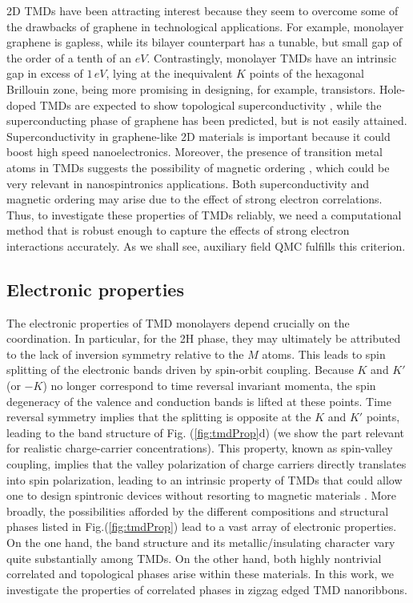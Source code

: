 \ac{2D} \acp{TMD} have been attracting interest because they seem to overcome some of the drawbacks of graphene in technological applications.
For example, monolayer graphene is gapless, while its bilayer counterpart has a tunable, but small gap of the order of a tenth of an $eV$.
Contrastingly, monolayer \acp{TMD} have an intrinsic gap in excess of $1 \, eV$, lying at the inequivalent $K$ points of the hexagonal Brillouin zone, being more promising in designing, for example, transistors.
Hole-doped \acp{TMD} are expected to show topological superconductivity \cite{hsu_topological_2017}, while the superconducting phase of graphene has been predicted, but is not easily attained.
Superconductivity in graphene-like \ac{2D} materials is important because it could boost high speed nanoelectronics.
Moreover, the presence of transition metal atoms in \acp{TMD} suggests the possibility of magnetic ordering \cite{braz_valley_2017}, which could be very relevant in nanospintronics applications.
Both superconductivity and magnetic ordering may arise due to the effect of strong electron correlations.
Thus, to investigate these properties of \acp{TMD} reliably, we need a computational method that is robust enough to capture the effects of strong electron interactions accurately.
As we shall see, auxiliary field \ac{QMC}  fulfills this criterion.

\subsection{Electronic properties}\label{subsec:electronic}

The electronic properties of \ac{TMD} monolayers depend crucially on the coordination.
In particular, for the 2H phase, they may ultimately be attributed to the lack of inversion symmetry relative to the $M$ atoms.
This leads to spin splitting of the electronic bands driven by spin-orbit coupling.
Because $K$ and $K'$ (or $-K$) no longer correspond to time reversal invariant momenta, the spin degeneracy of the valence and conduction bands is lifted at these points.
Time reversal symmetry implies that the splitting is opposite at the $K$ and $K'$ points, leading to the band structure of Fig. (\ref{fig:tmdProp}d) (we show the part relevant for realistic charge-carrier concentrations).
This property, known as spin-valley coupling, implies that the valley polarization of charge carriers directly translates into spin polarization, leading to an intrinsic property of \acp{TMD} that could allow one to design spintronic devices without resorting to magnetic materials \cite{manzeli_2d_2017}.
More broadly, the possibilities afforded by the different compositions and structural phases listed in Fig.(\ref{fig:tmdProp}) lead to a vast array of electronic properties.
On the one hand, the band structure and its metallic/insulating character vary quite substantially among \acp{TMD}.
On the other hand, both highly nontrivial  correlated and topological phases arise within these materials.
In this work, we investigate the properties of correlated phases in zigzag edged \ac{TMD} nanoribbons.


